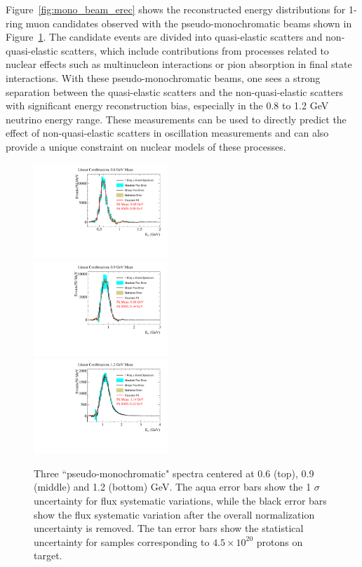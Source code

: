 Figure~\ref{fig:mono_beam_erec} shows the reconstructed energy distributions for 1-ring muon candidates 
observed with the pseudo-monochromatic beams shown in Figure~\ref{fig:mono_beam}. The candidate events
are divided into quasi-elastic scatters and non-quasi-elastic scatters, which include contributions from
processes related to nuclear effects such as multinucleon interactions or pion absorption in final state
interactions.  With these pseudo-monochromatic beams, one sees a strong separation between the quasi-elastic 
scatters and the non-quasi-elastic scatters with significant energy reconstruction bias, especially in the
0.8 to 1.2 GeV neutrino energy range.  These measurements can be used to directly predict the effect of
non-quasi-elastic scatters in oscillation measurements and can also provide a unique constraint on nuclear 
models of these processes.

\begin{figure}[htpb]
\includegraphics[width=0.45\textwidth]{figures/lc_etrue_600mev.pdf} \\
\includegraphics[width=0.45\textwidth]{figures/lc_etrue_900mev.pdf} \\
\includegraphics[width=0.45\textwidth]{figures/lc_etrue_1200mev.pdf} 
\caption{Three ``pseudo-monochromatic" spectra centered at 0.6 (top), 0.9 (middle) and 1.2 (bottom) GeV.  The aqua error bars show
the 1 $\sigma$ uncertainty for flux systematic variations, while the black error bars show the flux systematic variation after the
overall normalization uncertainty is removed.  The tan error bars show the statistical uncertainty for samples corresponding to 
 $4.5\times10^{20}$ protons on target.  }
\label{fig:mono_beam}
\end{figure}

